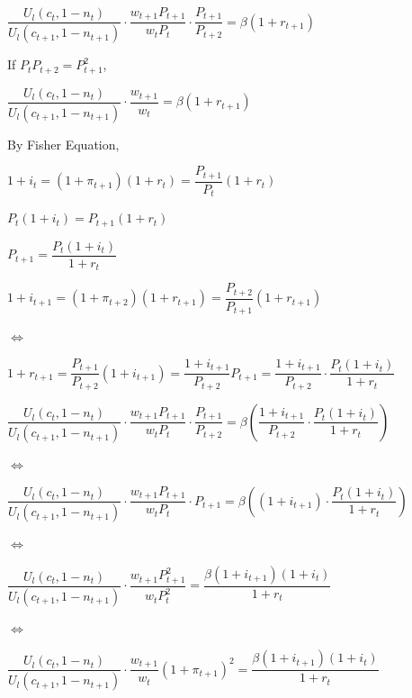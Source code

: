 \documentclass{article}
\begin{document}
$\dfrac{U_{l}\left(c_{t},1-n_{t}\right)}{U_{l}\left(c_{t+1},1-n_{t+1}\right)}\cdot\dfrac{w_{t+1}P_{t+1}}{w_{t}P_{t}}\cdot\dfrac{P_{t+1}}{P_{t+2}}=\beta\left(1+r_{t+1}\right)$

If $P_{t}P_{t+2}=P^{2}_{t+1}$,

$\dfrac{U_{l}\left(c_{t},1-n_{t}\right)}{U_{l}\left(c_{t+1},1-n_{t+1}\right)}\cdot\dfrac{w_{t+1}}{w_{t}}=\beta\left(1+r_{t+1}\right)$

By Fisher Equation,

$1+i_{t}=\left(1+\pi_{t+1}\right)\left(1+r_{t}\right)=\dfrac{P_{t+1}}{P_{t}}\left(1+r_{t}\right)$

$P_{t}\left(1+i_{t}\right)=P_{t+1}\left(1+r_{t}\right)$

$P_{t+1}=\dfrac{P_{t}\left(1+i_{t}\right)}{1+r_{t}}$

$1+i_{t+1}=\left(1+\pi_{t+2}\right)\left(1+r_{t+1}\right)=\dfrac{P_{t+2}}{P_{t+1}}\left(1+r_{t+1}\right)$

$\iff$

$1+r_{t+1}=\dfrac{P_{t+1}}{P_{t+2}}\left(1+i_{t+1}\right)=\dfrac{1+i_{t+1}}{P_{t+2}}P_{t+1}=\dfrac{1+i_{t+1}}{P_{t+2}}\cdot\dfrac{P_{t}\left(1+i_{t}\right)}{1+r_{t}}$

$\dfrac{U_{l}\left(c_{t},1-n_{t}\right)}{U_{l}\left(c_{t+1},1-n_{t+1}\right)}\cdot\dfrac{w_{t+1}P_{t+1}}{w_{t}P_{t}}\cdot\dfrac{P_{t+1}}{P_{t+2}}=\beta\left(\dfrac{1+i_{t+1}}{P_{t+2}}\cdot\dfrac{P_{t}\left(1+i_{t}\right)}{1+r_{t}}\right)$

$\iff$

$\dfrac{U_{l}\left(c_{t},1-n_{t}\right)}{U_{l}\left(c_{t+1},1-n_{t+1}\right)}\cdot\dfrac{w_{t+1}P_{t+1}}{w_{t}P_{t}}\cdot P_{t+1}=\beta\left(\left(1+i_{t+1}\right)\cdot\dfrac{P_{t}\left(1+i_{t}\right)}{1+r_{t}}\right)$

$\iff$

$\dfrac{U_{l}\left(c_{t},1-n_{t}\right)}{U_{l}\left(c_{t+1},1-n_{t+1}\right)}\cdot\dfrac{w_{t+1}P^{2}_{t+1}}{w_{t}P^{2}_{t}}=\dfrac{\beta\left(1+i_{t+1}\right)\left(1+i_{t}\right)}{1+r_{t}}$

$\iff$

$\dfrac{U_{l}\left(c_{t},1-n_{t}\right)}{U_{l}\left(c_{t+1},1-n_{t+1}\right)}\cdot\dfrac{w_{t+1}}{w_{t}}\left(1+\pi_{t+1}\right)^{2}=\dfrac{\beta\left(1+i_{t+1}\right)\left(1+i_{t}\right)}{1+r_{t}}$
\end{document}
